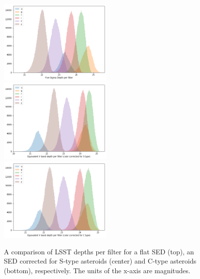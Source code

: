 \begin{figure}[tb!]
\begin{center}
\includegraphics[width=0.5\textwidth]{figs/5sig_filter.png}\\
\includegraphics[width=0.5\textwidth]{figs/5sig_filter_S.png}\\
\includegraphics[width=0.5\textwidth]{figs/5sig_filter_C.png}
\end{center}
\caption{A comparison of \gls{LSST} depths per filter for a flat \gls{SED} (top), an \gls{SED} corrected for S-type asteroids (center) and C-type asteroids (bottom), respectively. The units of the x-axis are magnitudes. }
\label{fig:sed}       %
\end{figure}
%
% 
\clearpage
